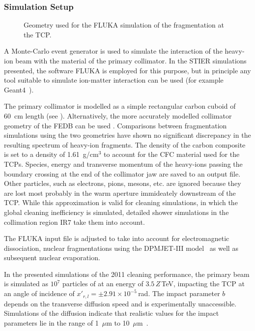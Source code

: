 \subsubsection{Simulation Setup}
%
\begin{figure}[b]
  \centering
  \def\svgwidth{0.65\linewidth}
  
  \caption{
    Geometry used for the FLUKA simulation of the fragmentation
    at the TCP.%
  }
  \label{pic:14112701}
\end{figure}
%
A Monte-Carlo event generator is used to simulate the interaction of the heavy-ion beam with the material of the primary collimator. In the STIER simulations presented, the software FLUKA is employed for this purpose, but in principle any tool suitable to simulate ion-matter interaction can be used (for example Geant4~\cite{Agostinelli2003250,1610988}). 

The primary collimator is modelled as a simple rectangular carbon cuboid of 60~cm length (see ). Alternatively, the more accurately modelled collimator geometry of the FEDB can be used . Comparisons between fragmentation simulations using the two geometries have shown no significant discrepancy in the resulting spectrum of heavy-ion fragments. The density of the carbon composite is set to a density of 1.61~g/cm$^3$ to account for the CFC material used for the TCPs. Species, energy and transverse momentum of the heavy-ions passing the boundary crossing at the end of the collimator jaw are saved to an output file. Other particles, such as electrons, pions, mesons, etc. are ignored because they are lost most probably in the warm aperture immideately downstream of the TCP. While this approximation is valid for cleaning simulations, in which the global cleaning inefficiency is simulated, detailed shower simulations in the collimation region IR7 take them into account.  

The FLUKA input file is adjusted to take into account for electromagnetic dissociation, nuclear fragmentations using the DPMJET-III model~\cite{} as well as subsequent nuclear evaporation.

In the presented simulations of the 2011 cleaning performance, the primary beam is simulated as $10^7$ particles of \lead at an energy of $3.5\,Z\,$TeV, impacting the TCP at an angle of incidence of $x'_{r,l}= \pm 2.91\times 10^{-5}\,$rad. The impact parameter $b$ depends on the transverse diffusion speed and is experimentally unaccessible. Simulations of the diffusion indicate that realistic values for the impact parameters lie in the range of 1~$\mu$m to 10~$\mu$m~\cite{}.  

